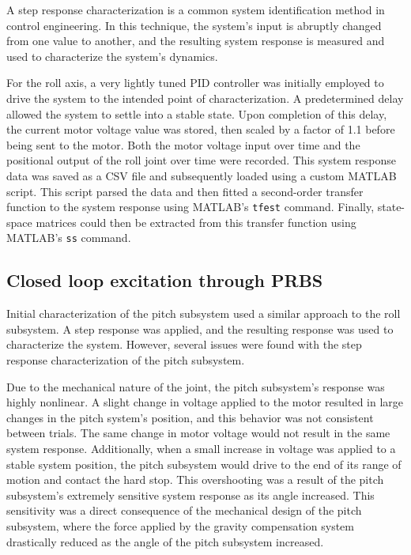 A step response characterization is a common system identification method in control engineering. In this technique, the system's input is abruptly changed from one value to another, and the resulting system response is measured and used to characterize the system's dynamics.

For the roll axis, a very lightly tuned PID controller was initially employed to drive the system to the intended point of characterization. A predetermined delay allowed the system to settle into a stable state. Upon completion of this delay, the current motor voltage value was stored, then scaled by a factor of 1.1 before being sent to the motor. Both the motor voltage input over time and the positional output of the roll joint over time were recorded. This system response data was saved as a CSV file and subsequently loaded using a custom MATLAB script. This script parsed the data and then fitted a second-order transfer function to the system response using MATLAB's \texttt{tfest} command. Finally, state-space matrices could then be extracted from this transfer function using MATLAB's \texttt{ss} command.



\subsection{Closed loop excitation through PRBS}

Initial characterization of the pitch subsystem used a similar approach to the roll subsystem. A step response was applied, and the resulting response was used to characterize the system. However, several issues were found with the step response characterization of the pitch subsystem.

Due to the mechanical nature of the joint, the pitch subsystem's response was highly nonlinear. A slight change in voltage applied to the motor resulted in large changes in the pitch system's position, and this behavior was not consistent between trials. The same change in motor voltage would not result in the same system response. Additionally, when a small increase in voltage was applied to a stable system position, the pitch subsystem would drive to the end of its range of motion and contact the hard stop. This overshooting was a result of the pitch subsystem's extremely sensitive system response as its angle increased. This sensitivity was a direct consequence of the mechanical design of the pitch subsystem, where the force applied by the gravity compensation system drastically reduced as the angle of the pitch subsystem increased.

